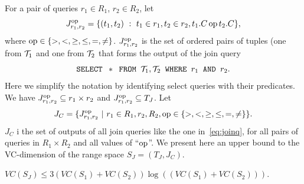 For a pair of queries $r_1\in R_1$, $r_2\in R_2$, let
\[
J^{\operatorname{op}}_{r_1,r_2}=\{(t_1,t_2) ~:~ t_1\in
r_1, t_2\in r_2, t_1.C \operatorname{op} t_2.C\},\]
where $\operatorname{op}\in\{>,<,\ge,\le,=,\neq\}$. $J^{\operatorname{op}}_{r_1,r_2}$ is the set of ordered pairs of
tuples (one from ${\cal T}_1$ and one from ${\cal T}_2$ that forms the output of the
join query 
\begin{equation}\label{eq:joinq}
\mbox{\texttt{SELECT }} *\mbox{\texttt{ FROM }} {\cal T}_1,{\cal T}_2 \mbox{\texttt{
WHERE }} r_1 \mbox{\texttt{ AND }} r_2.
\end{equation}
Here we simplify the notation by identifying select queries with
their predicates. We have $J^{\operatorname{op}}_{r_1,r_2}\subseteq
r_1\times r_2$ and $J^{\operatorname{op}}_{r_1,r_2}\subseteq T_J$. Let 
\[ J_C =\{J^{\operatorname{op}}_{r_1,r_2}~|~r_1\in R_1, r_2,R_2, \operatorname{op}\in\{>,<,\ge,\le,=,\neq\}
\}.\]
$J_C$ i the set of outputs of all join queries like the one in~\eqref{eq:joinq},
for all pairs of queries in $R_1\times R_2$ and all values of ``$\operatorname{op}$''. We
present here an upper bound to the VC-dimension of the range space
$S_J=(T_J,J_C)$.

\begin{lemma}\label{lem:vcdimjoin}
  $VC(S_J)\leq 3(VC(S_1)+VC(S_2))\log ((VC(S_1)+VC(S_2))).$
\end{lemma}

